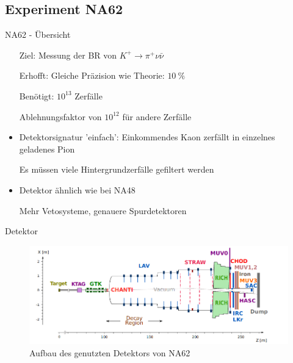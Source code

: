 \documentclass[aspectratio=1610, professionalfonts, 9pt, t]{beamer}
\begin{document}
  \subsection{Experiment NA62}

  \begin{frame}{NA62 - Übersicht}
    \begin{itemize}
      \setlength{\itemindent}{0.5cm}
      \item[Ziel:] Messung der BR von $K^+ \rightarrow \pi^+ \nu \bar{\nu}$
      \item[Erhofft:] Gleiche Präzision wie Theorie: $\SI{10}{\percent}$
      \item[Benötigt:] $10^{13}$ Zerfälle
    \end{itemize}
    \begin{itemize}
      \item[\rightarrow] Ablehnungsfaktor von $10^{12}$ für andere Zerfälle
      \item Detektorsignatur 'einfach': Einkommendes Kaon zerfällt in einzelnes geladenes Pion
      \item[\rightarrow] Es müssen viele Hintergrundzerfälle gefiltert werden
      \item Detektor ähnlich wie bei NA48
      \item[\rightarrow] Mehr Vetosysteme, genauere Spurdetektoren
    \end{itemize}
  \end{frame}

  \begin{frame}{Detektor}
    \begin{figure}[ht]
      \includegraphics[height=0.75\textheight]{Images/na62detektor.png}
      \caption{Aufbau des genutzten Detektors von NA62}%
    \end{figure}
  \end{frame}
\end{document}
